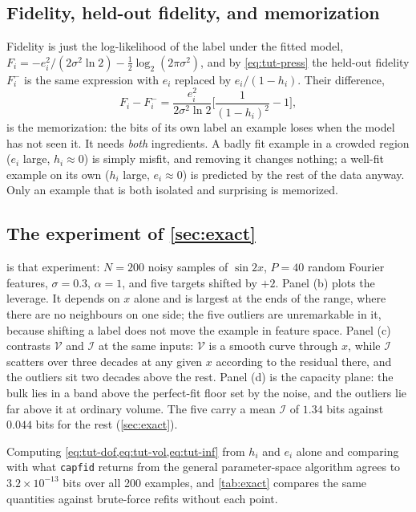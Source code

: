 \documentclass[10pt,twocolumn,letterpaper]{article}
\theoremstyle{definition}
\newcommand{\Vol}{\mathcal{V}}
\newcommand{\Inf}{\mathcal{I}}
\begin{document}
\subsection{Fidelity, held-out fidelity, and memorization}
Fidelity is just the log-likelihood of the label under the fitted model, $F_i=-e_i^2/(2\sigma^2\ln2)-\tfrac12\log_2(2\pi\sigma^2)$, and by \cref{eq:tut-press} the held-out fidelity $F_i^-$ is the same expression with $e_i$ replaced by $e_i/(1-h_i)$. Their difference,
\begin{equation}
F_i-F_i^-=\frac{e_i^2}{2\sigma^2\ln2}\Big[\frac{1}{(1-h_i)^2}-1\Big],
\end{equation}
is the memorization: the bits of its own label an example loses when the model has not seen it. It needs \emph{both} ingredients. A badly fit example in a crowded region ($e_i$ large, $h_i\approx0$) is simply misfit, and removing it changes nothing; a well-fit example on its own ($h_i$ large, $e_i\approx0$) is predicted by the rest of the data anyway. Only an example that is both isolated and surprising is memorized.

\subsection{The experiment of \texorpdfstring{\cref{sec:exact}}{Section 4.1}}
 is that experiment: $N=200$ noisy samples of $\sin2x$, $P=40$ random Fourier features, $\sigma=0.3$, $\alpha=1$, and five targets shifted by $+2$. Panel (b) plots the leverage. It depends on $x$ alone and is largest at the ends of the range, where there are no neighbours on one side; the five outliers are unremarkable in it, because shifting a label does not move the example in feature space. Panel (c) contrasts $\Vol$ and $\Inf$ at the same inputs: $\Vol$ is a smooth curve through $x$, while $\Inf$ scatters over three decades at any given $x$ according to the residual there, and the outliers sit two decades above the rest. Panel (d) is the capacity plane: the bulk lies in a band above the perfect-fit floor set by the noise, and the outliers lie far above it at ordinary volume. The five carry a mean $\Inf$ of $1.34$ bits against $0.044$ bits for the rest (\cref{sec:exact}).

Computing \cref{eq:tut-dof,eq:tut-vol,eq:tut-inf} from $h_i$ and $e_i$ alone and comparing with what \texttt{capfid} returns from the general parameter-space algorithm agrees to $3.2\times10^{-13}$ bits over all 200 examples, and \cref{tab:exact} compares the same quantities against brute-force refits without each point.
\end{document}

